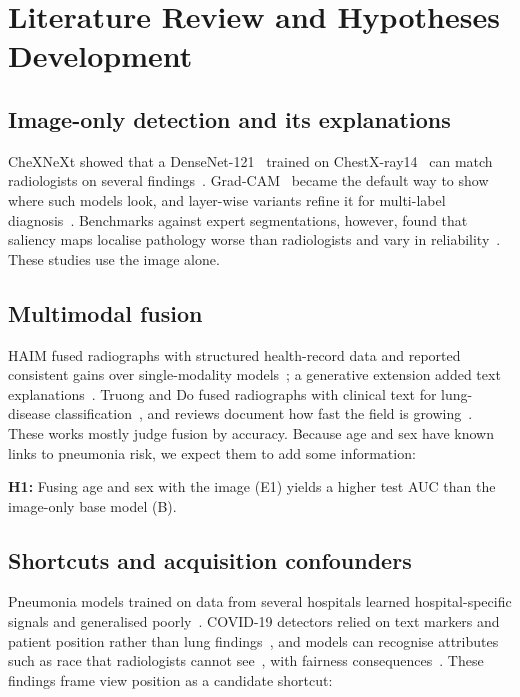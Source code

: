 \documentclass[conference]{IEEEtran}
\begin{document}
\section{Literature Review and Hypotheses Development}
\label{sec:lit}

\subsection{Image-only detection and its explanations}
CheXNeXt showed that a DenseNet-121~\cite{huang2017densenet} trained on ChestX-ray14~\cite{wang2017chestxray8} can match radiologists on several findings~\cite{rajpurkar2018chexnext}. Grad-CAM~\cite{selvaraju2017gradcam} became the default way to show where such models look, and layer-wise variants refine it for multi-label diagnosis~\cite{kim2025layerwise}. Benchmarks against expert segmentations, however, found that saliency maps localise pathology worse than radiologists and vary in reliability~\cite{saporta2022saliency,arun2021trustworthiness}. These studies use the image alone.

\subsection{Multimodal fusion}
HAIM fused radiographs with structured health-record data and reported consistent gains over single-modality models~\cite{soenksen2022haim}; a generative extension added text explanations~\cite{petridis2025xhaim}. Truong and Do fused radiographs with clinical text for lung-disease classification~\cite{truong2025multimodal}, and reviews document how fast the field is growing~\cite{sun2023scoping,acosta2022multimodal}. These works mostly judge fusion by accuracy. Because age and sex have known links to pneumonia risk, we expect them to add some information:

\textbf{H1:} Fusing age and sex with the image (E1) yields a higher test AUC than the image-only base model (B).

\subsection{Shortcuts and acquisition confounders}
Pneumonia models trained on data from several hospitals learned hospital-specific signals and generalised poorly~\cite{zech2018confounding}. COVID-19 detectors relied on text markers and patient position rather than lung findings~\cite{degrave2021shortcuts}, and models can recognise attributes such as race that radiologists cannot see~\cite{gichoya2022race}, with fairness consequences~\cite{seyyed2021underdiagnosis}. These findings frame view position as a candidate shortcut:
\end{document}
